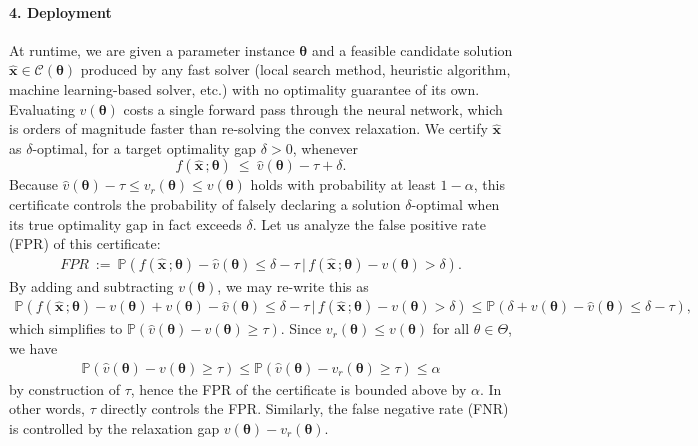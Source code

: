 \documentclass[10pt]{article} %
\theoremstyle{plain}
\theoremstyle{definition}
\theoremstyle{remark}
\begin{document}
\paragraph{4. Deployment} At runtime, we are given a parameter instance $\bm{\theta}$ and a feasible candidate solution $\hat{\mathbf{x}} \in \mathcal{C}(\bm{\theta})$ produced by any fast solver (local search method, heuristic algorithm, machine learning-based solver, etc.) with no optimality guarantee of its own. Evaluating $\hat{v}(\bm{\theta})$ costs a single forward pass through the neural network, which is orders of magnitude faster than re-solving the convex relaxation. We certify $\hat{\mathbf{x}}$ as $\delta$-optimal, for a target optimality gap $\delta > 0$, whenever
\begin{equation*}
    f(\hat{\mathbf{x}}\, ; \bm{\theta}) ~\leq~ \hat{v}(\bm{\theta}) - \tau + \delta.
\end{equation*}
Because $\hat{v}(\bm{\theta}) - \tau \leq v_r(\bm{\theta}) \leq v(\bm{\theta})$ holds with probability at least $1 - \alpha$, this certificate controls the probability of falsely declaring a solution $\delta$-optimal when its true optimality gap in fact exceeds $\delta$.
Let us analyze the false positive rate (FPR) of this certificate:
\begin{align*}
    \mathit{FPR} ~:=~ \mathbb{P}(f(\hat{\mathbf{x}}\, ; \bm{\theta}) - \hat{v}(\bm{\theta}) \leq \delta - \tau \,|\, f(\hat{\mathbf{x}}\, ; \bm{\theta}) - v(\bm{\theta}) > \delta).
\end{align*}
By adding and subtracting $v(\bm{\theta})$, we may re-write this as
\begin{align*}
    \mathbb{P}(f(\hat{\mathbf{x}}\, ; \bm{\theta}) - v(\bm{\theta}) + v(\bm{\theta}) - \hat{v}(\bm{\theta}) \leq \delta - \tau \,|\, f(\hat{\mathbf{x}}\, ; \bm{\theta}) - v(\bm{\theta}) > \delta)
    \leq \mathbb{P}(\delta + v(\bm{\theta}) - \hat{v}(\bm{\theta}) \leq \delta - \tau),
\end{align*}
which simplifies to $\mathbb{P}(\hat{v}(\bm{\theta}) - v(\bm{\theta}) \geq \tau)$. Since $v_r(\bm{\theta}) \leq v(\bm{\theta})$ for all $\theta \in \Theta$, we have
\begin{align*}
    \mathbb{P}(\hat{v}(\bm{\theta}) - v(\bm{\theta}) \geq \tau) \leq \mathbb{P}(\hat{v}(\bm{\theta}) - v_r(\bm{\theta}) \geq \tau) \leq \alpha
\end{align*}
by construction of $\tau$, hence the FPR of the certificate is bounded above by $\alpha$. In other words, $\tau$ directly controls the FPR. Similarly, the false negative rate (FNR) is controlled by the relaxation gap $v(\bm{\theta}) - v_r(\bm{\theta})$.
\end{document}
